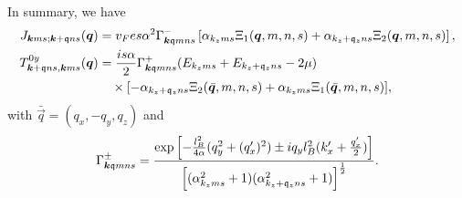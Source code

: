 \begin{summary}
  \label{summary:tilt:matrixelements}
  In summary, we have
  \begin{align}
    \label{eq:112}
    J_{\bm{k} m s; \bm{k} + \mathfrak{q} n s} (\bm{q}) &=
                                                        v_{F} e s \alpha^2
                                                        \Gamma ^-_{\bm{k} \mathfrak{q} m n s}
                                                        \left[ \alpha_{k_z m s} \Xi_{1} (\bm{q}, m, n, s)
                                                        + \alpha_{k_z + \mathfrak{q}_z n s} \Xi _{2} (\bm{q}, m, n, s) \right],\\
    T_{\bm{k} + \mathfrak{q} n s, \bm{k} m s}^{0y} (\bm{q}) &=
                                                             \frac{is \alpha}{2}
                                                             \Gamma ^+_{\bm{k} \mathfrak{q} m n s}
                                                             (E_{k_z m s} + E_{k_z + \mathfrak{q}_z n  s} - 2 \mu)\\
    \nonumber &\quad\times [- \alpha_{k_z + \mathfrak{q}_z n s} \Xi_{2} (\bar{\bm{q}}, m, n, s) + \alpha_{k_z m s} \Xi_{1}(\bar{\bm{q}}, m, n, s)],
  \end{align}
  with \( \bar{\vec{q}} = (q_x, -q_y, q_z) \) and
  \[
    \Gamma _{\bm{k} \mathfrak{q} m n s}^{\pm} =
    \frac{
      \exp
      \left[
        - \frac{l_{B}^2}{4 \alpha } (q_{y}^2 + (q' _x)^2) \pm  i q_y l_B^2 (k' _x + \frac{q'_x}{2} )
      \right]
    }{
      \left[(\alpha_{k_z m s}^2 +1) (\alpha_{k_z + \mathfrak{q}_z ns} ^2 + 1)\right]^{\frac{1}{2}}
    }.
  \]
\end{summary}
